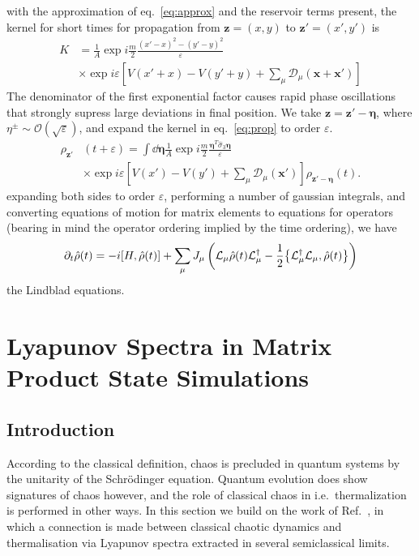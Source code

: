 \documentclass{article}
\let\vec\bm
\begin{document}
with the approximation of eq.~\ref{eq:approx} and the reservoir terms present, the kernel for short times for propagation from $\vec{z} = (x, y)$ to $\vec{z}' = (x', y')$ is
\begin{align}
    K &= \frac{1}{A} \exp{i\frac{m}{2}\frac{\left({x}'-{x}\right)^2-\left({y}'-{y}\right)^2}{\varepsilon}}\\
    &\times \exp{i\varepsilon \left[V\left({x}'+{x}\right)-V\left({y}'+{y}\right) + \sum_\mu \mathcal{D}_\mu(\vec{x}+\vec{x}')\right]}\nonumber
\end{align}
The denominator of the first exponential factor causes rapid phase oscillations that strongly supress large deviations in final position.
We take $\vec{z} = \vec{z}' - \vec{\eta}$, where $\eta^\pm  \sim \mathcal{O}(\sqrt{\varepsilon})$, and expand the kernel in eq.~\ref{eq:prop} to order $\varepsilon$. 
\begin{align}
    \rho_{\vec{z}'}&(t+\varepsilon) = \int \dd{\vec{\eta}}\frac{1}{A} \exp{i\frac{m}{2}\frac{\vec{\eta}^T\hat{\sigma}_3\vec{\eta}}{\varepsilon}}\\
    &\times \exp{i\varepsilon \left[V\left({x'}\right)-V\left({y'}\right) + \sum_\mu \mathcal{D}_\mu(\vec{x'})\right]}\rho_{\vec{z}'-\vec{\eta}}(t).\nonumber
\end{align}
expanding both sides to order $\varepsilon$, performing a number of gaussian integrals, and converting equations of motion for matrix elements to equations for operators (bearing in mind the operator ordering implied by the time ordering), we have
\begin{equation}
    \partial_t \hat{\rho}(t) = -i \comm{H}{\hat{\rho}(t)} + \sum_\mu J_\mu\left( \mathcal{L}_\mu\hat{\rho}(t)\mathcal{L}_\mu^\dagger - \frac{1}{2} \acomm{\mathcal{L}_\mu^\dagger\mathcal{L}_\mu}{\hat{\rho}(t)}\right)\nonumber
\end{equation}
the Lindblad equations.
%
\section{Lyapunov Spectra in Matrix Product State Simulations}\label{sec:chaos}
%
\subsection{Introduction}
According to the classical definition, chaos is precluded in quantum systems by the unitarity of the Schr\"odinger equation.
Quantum evolution does show signatures of chaos however, and the role of classical chaos in i.e.\ thermalization is performed in other ways.
In this section we build on the work of Ref.~\cite{Andrew}, in which a connection is made between classical chaotic dynamics and thermalisation via Lyapunov spectra extracted in several semiclassical limits.
%
\end{document}
